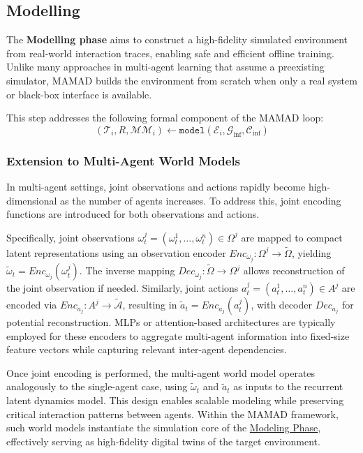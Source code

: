 \documentclass[pdflatex,sn-mathphys-num]{sn-jnl}%
\theoremstyle{thmstyleone}%
\theoremstyle{thmstyletwo}%
\theoremstyle{thmstylethree}%
\begin{document}
% 


\subsection{Modelling}\label{sec:modelling}

The \textbf{Modelling phase} aims to construct a high-fidelity simulated environment from real-world interaction traces, enabling safe and efficient offline training. Unlike many approaches in multi-agent learning that assume a preexisting simulator, MAMAD builds the environment from scratch when only a real system or black-box interface is available.

This step addresses the following formal component of the MAMAD loop:  
\[
    (\mathcal{T}_i, R, \mathcal{MM}_i) \gets \texttt{model}(\mathcal{E}_i, \mathcal{G}_{\text{inf}}, \mathcal{C}_{\text{inf}})
\]


\subsubsection{Extension to Multi-Agent World Models}

In multi-agent settings, joint observations and actions rapidly become high-dimensional as the number of agents increases. To address this, joint encoding functions are introduced for both observations and actions.

Specifically, joint observations $\omega_t^{j} = (\omega_t^1, \dots, \omega_t^n) \in \Omega^{j}$ are mapped to compact latent representations using an observation encoder $Enc_{\omega_j}: \Omega^{j} \rightarrow \tilde{\Omega}$, yielding $\tilde{\omega}_t = Enc_{\omega_j}(\omega_t^{j})$. The inverse mapping $Dec_{\omega_j}: \tilde{\Omega} \rightarrow \Omega^{j}$ allows reconstruction of the joint observation if needed. Similarly, joint actions $a_t^{j} = (a_t^1, \dots, a_t^n) \in A^{j}$ are encoded via $Enc_{a_j}: A^{j} \rightarrow \tilde{\mathcal{A}}$, resulting in $\tilde{a}_t = Enc_{a_j}(a_t^{j})$, with decoder $Dec_{a_j}$ for potential reconstruction.
%
MLPs or attention-based architectures are typically employed for these encoders to aggregate multi-agent information into fixed-size feature vectors while capturing relevant inter-agent dependencies.

Once joint encoding is performed, the multi-agent world model operates analogously to the single-agent case, using $\tilde{\omega}_t$ and $\tilde{a}_t$ as inputs to the recurrent latent dynamics model. This design enables scalable modeling while preserving critical interaction patterns between agents. Within the MAMAD framework, such world models instantiate the simulation core of the \hyperref[sec:modelling]{Modeling Phase}, effectively serving as high-fidelity digital twins of the target environment.
\end{document}
